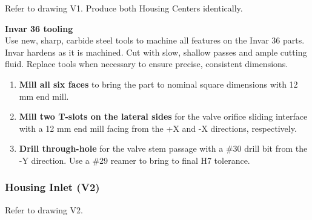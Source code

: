 \documentclass[12pt, letterpaper]{report}%
\newcounter{mycounter}           %
\newcounter{sub}[mycounter]      %
\begin{document}
\begin{appendices}
	Refer to drawing V1. Produce both Housing Centers identically.

	\begin{notebox}
	\textbf{Invar 36 tooling} \\
	Use new, sharp, carbide steel tools to machine all features on the Invar 36 parts.
	Invar hardens as it is machined. Cut with slow, shallow passes and ample cutting fluid.
	Replace tools when necessary to ensure precise, consistent dimensions.
	\end{notebox}

	\begin{enumerate}[itemsep=4pt]
		\item \textbf{Mill all six faces} to bring the part to nominal square dimensions
					with 12\,mm end mill.
		\item \textbf{Mill two T-slots on the lateral sides} for the
					valve orifice sliding interface
					with a 12 mm end mill facing from the +X and -X directions, respectively.
		\item \textbf{Drill through-hole} for the valve stem passage
					with a \#30 drill bit from the -Y direction.
					Use a \#29 reamer to bring to final H7 tolerance.
	\end{enumerate}

	\subsubsection{Housing Inlet (V2)}
	\label{sec:mfg:V2}

	Refer to drawing V2.


\end{appendices}
\end{document}
